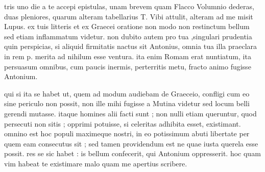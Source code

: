 


 tris uno die a te accepi epistulas, unam brevem quam Flacco Volumnio dederas, duas pleniores, quarum alteram tabellarius T. Vibi attulit, alteram ad me misit Lupus. ex tuis litteris et ex Graecei oratione non modo non restinctum bellum sed etiam inflammatum videtur. non dubito autem pro tua ,singulari prudentia quin perspicias, si aliquid firmitatis nactus sit Antonius, omnia tua illa praeclara in rem p. merita ad nihilum esse ventura. ita enim Romam erat nuntiatum, ita persuasum omnibus, cum paucis inermis, perterritis metu, fracto animo fugisse Antonium.

 qui si ita se habet ut, quem ad modum audiebam de Graeceio, confligi cum eo sine periculo non possit, non ille mihi fugisse a Mutina videtur sed locum belli gerendi mutasse. itaque homines alii facti sunt ; non nulli etiam queruntur, quod persecuti non sitis ; opprimi potuisse, si celeritas adhibita esset, existimant. omnino est hoc populi maximeque nostri, in eo potissimum abuti libertate per quem eam consecutus sit ; sed tamen providendum est ne quae iusta querela esse possit. res se sic habet : is bellum confecerit, qui Antonium oppresserit. hoc quam vim habeat te existimare malo quam me apertius scribere.
